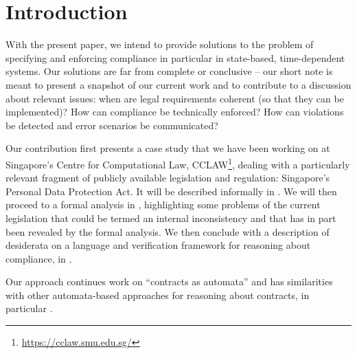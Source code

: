 \section{Introduction}

With the present paper, we intend to provide solutions to the problem of
specifying and enforcing compliance in particular in state-based,
time-dependent systems. Our solutions are far from complete or conclusive --
our short note is meant to present a snapshot of our current work and to
contribute to a discussion about relevant issues: when are legal requirements
coherent (so that they can be implemented)? How can compliance be technically
enforced? How can violations be detected and error scenarios be communicated?

Our contribution first presents a case study that we have been working on at
Singapore's Centre for Computational Law,
CCLAW\footnote{\url{https://cclaw.smu.edu.sg/}}, dealing with a particularly
relevant fragment of publicly available legislation and regulation:
Singapore's Personal Data Protection Act. It will be described informally  in
. We will then proceed to a formal analysis in
, highlighting some problems of the current
legislation that could be termed an internal inconsistency and that has in
part been revealed by the formal analysis. We then conclude with a description
of desiderata on a language and verification framework for reasoning about
compliance, in . 

Our approach continues work on ``contracts as automata''
\cite{flood_goodenough_contract_as_automaton_2022} and has similarities with
other automata-based approaches for reasoning about contracts, in particular
\cite{azzopardi_pace_schapachnik_schneider_contract_automata_2016,parvizimosaed_roveri_rasti_amyot_logrippo_mylopoulos_model_checking_symboleo_2022}. 





